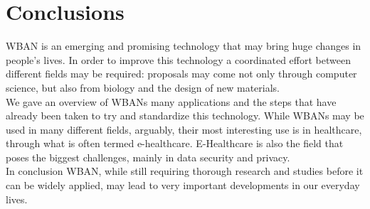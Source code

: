 \documentclass[conference]{IEEEtran}
\begin{document}
\section{Conclusions}
WBAN is an emerging and promising technology that may bring huge changes in people’s lives. In order to improve this technology a coordinated effort between different fields may be required:  proposals may come not only through computer science, but also from biology and the design of new materials. 
\\We gave an overview of WBANs many applications and the steps that have already been taken to try and standardize this technology. While WBANs may be used in many different fields, arguably, their most interesting use is in healthcare, through what is often termed e-healthcare. E-Healthcare is also the field that poses the biggest challenges, mainly in data security and privacy.
\\In conclusion WBAN, while still requiring thorough research and studies before it can be widely applied, may lead to very important developments in our everyday lives. 
\end{document}
